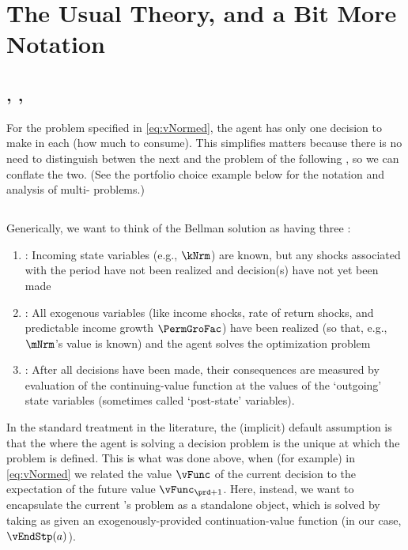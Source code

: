 
\hypertarget{the-usual-theory}{}
\section{The Usual Theory, and a Bit More Notation}\label{sec:the-usual-theory}


\subsection{\Intervals, \Stgs, \Moves}

For the problem specified in \eqref{eq:vNormed}, the agent has only one decision to make in each {\interval} (how much to consume). %
This simplifies matters because there is no need to distinguish betwen the next {\stg} and the problem of the following {\interval}, so we can conflate the two.  (See the portfolio choice example below for the notation and analysis of multi-{\stg} problems.)

\subsection{\Moves}

Generically, we want to think of the Bellman solution as having three {\moves}:
\begin{enumerate}
\item \textbf{\Arrival}: Incoming state variables (e.g., $\kNrm$) are known, but any shocks associated with the period have not been realized and decision(s) have not yet been made
\item \textbf{\Decision}: All exogenous variables (like income shocks, rate of return shocks, and predictable income growth $\PermGroFac$) have been realized (so that, e.g., $\mNrm$'s value is known) and the agent solves the optimization problem
\item \textbf{\Continuation}: After all decisions have been made, their consequences are measured by evaluation of the continuing-value function at the values of the `outgoing' state variables (sometimes called `post-state' variables).
\end{enumerate}

In the standard treatment in the literature, the (implicit) default assumption is that the {\move} where the agent is solving a decision problem is the unique {\move} at which the problem is defined.  This is what was done above, when (for example) in \eqref{eq:vNormed} we related the value $\vFunc$ of the current decision to the expectation of the future value $\vFunc_{\prd+1}$.  Here, instead, we want to encapsulate the current {\stg}'s problem as a standalone object, which is solved by taking as given an exogenously-provided continuation-value function (in our case, $\vEndStp(a)$).

